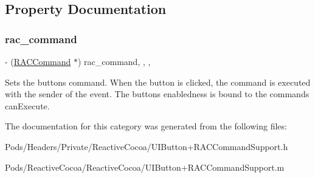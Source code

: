 \subsection{Property Documentation}
\mbox{\label{category_u_i_button_07_r_a_c_command_support_08_a5eb6f25fc7ea50c164fb19287d5a2e3e}} 
\subsubsection{\texorpdfstring{rac\+\_\+command}{rac\_command}}
{\footnotesize\ttfamily -\/ (\mbox{\hyperlink{interface_r_a_c_command}{R\+A\+C\+Command}} $\ast$) rac\+\_\+command\hspace{0.3cm}{\ttfamily [read]}, {\ttfamily [write]}, {\ttfamily [nonatomic]}, {\ttfamily [strong]}}

Sets the button\textquotesingle{}s command. When the button is clicked, the command is executed with the sender of the event. The button\textquotesingle{}s enabledness is bound to the command\textquotesingle{}s {\ttfamily can\+Execute}. 

The documentation for this category was generated from the following files\+:\begin{DoxyCompactItemize}
\item 
Pods/\+Headers/\+Private/\+Reactive\+Cocoa/U\+I\+Button+\+R\+A\+C\+Command\+Support.\+h\item 
Pods/\+Reactive\+Cocoa/\+Reactive\+Cocoa/U\+I\+Button+\+R\+A\+C\+Command\+Support.\+m\end{DoxyCompactItemize}
